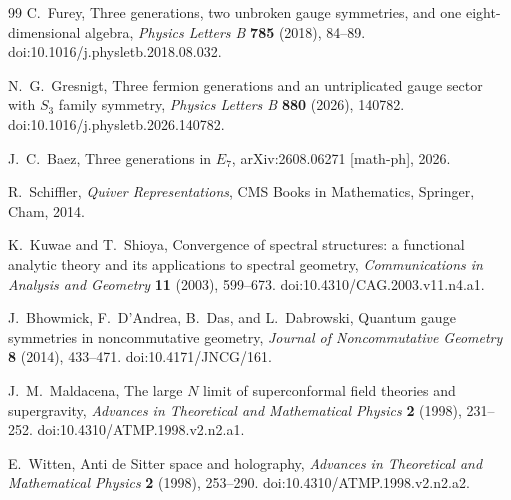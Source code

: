 \documentclass[11pt]{article}
\numberwithin{equation}{section}
\theoremstyle{definition}
\theoremstyle{remark}
\begin{document}
\begin{thebibliography}{99}
C.~Furey,
\newblock Three generations, two unbroken gauge symmetries, and one
eight-dimensional algebra,
\newblock \emph{Physics Letters B} \textbf{785} (2018), 84--89.
\newblock doi:10.1016/j.physletb.2018.08.032.

N.~G.~Gresnigt,
\newblock Three fermion generations and an untriplicated gauge sector with
$S_3$ family symmetry,
\newblock \emph{Physics Letters B} \textbf{880} (2026), 140782.
\newblock doi:10.1016/j.physletb.2026.140782.

J.~C.~Baez,
\newblock Three generations in $E_7$,
\newblock arXiv:2608.06271 [math-ph], 2026.

R.~Schiffler,
\newblock \emph{Quiver Representations},
\newblock CMS Books in Mathematics, Springer, Cham, 2014.

K.~Kuwae and T.~Shioya,
\newblock Convergence of spectral structures: a functional analytic theory and
its applications to spectral geometry,
\newblock \emph{Communications in Analysis and Geometry} \textbf{11} (2003),
599--673.
\newblock doi:10.4310/CAG.2003.v11.n4.a1.

J.~Bhowmick, F.~D'Andrea, B.~Das, and L.~Dabrowski,
\newblock Quantum gauge symmetries in noncommutative geometry,
\newblock \emph{Journal of Noncommutative Geometry} \textbf{8} (2014),
433--471.
\newblock doi:10.4171/JNCG/161.

J.~M.~Maldacena,
\newblock The large $N$ limit of superconformal field theories and supergravity,
\newblock \emph{Advances in Theoretical and Mathematical Physics} \textbf{2}
(1998), 231--252.
\newblock doi:10.4310/ATMP.1998.v2.n2.a1.

E.~Witten,
\newblock Anti de Sitter space and holography,
\newblock \emph{Advances in Theoretical and Mathematical Physics} \textbf{2}
(1998), 253--290.
\newblock doi:10.4310/ATMP.1998.v2.n2.a2.

\end{thebibliography}
\end{document}
